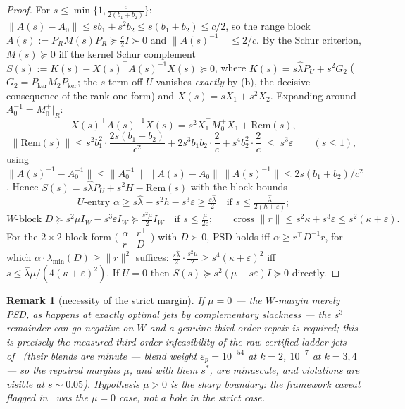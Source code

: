 \documentclass[11pt]{article}
\newtheorem{remark}[theorem]{Remark}
\newcommand{\eps}{\varepsilon}
\newcommand{\lam}{\lambda}
\begin{document}
\begin{proof}
For $s\le\min\{1,\tfrac c{2(b_1+b_2)}\}$:
$\|A(s)-A_0\|\le sb_1+s^2b_2\le s(b_1+b_2)\le c/2$, so the range block
$A(s):=P_RM(s)P_R\succeq\tfrac c2I\succ0$ and $\|A(s)^{-1}\|\le2/c$. By
the Schur criterion, $M(s)\succeq0$ iff the kernel Schur complement
$S(s):=K(s)-X(s)^\top A(s)^{-1}X(s)\succeq0$, where
$K(s)=s\hat\lam P_U+s^2G_2$ ($G_2=P_{\ker}M_2P_{\ker}$; the $s$-term off
$U$ vanishes \emph{exactly} by (b), the decisive consequence of the
rank-one form) and $X(s)=sX_1+s^2X_2$. Expanding around
$A_0^{-1}=M_0^{+}|_R$:
\[
X(s)^\top A(s)^{-1}X(s)=s^2X_1^\top M_0^{+}X_1+\mathrm{Rem}(s),
\]
\[
\|\mathrm{Rem}(s)\|\le s^2b_1^2\cdot\frac{2s(b_1+b_2)}{c^2}
+2s^3b_1b_2\cdot\frac2c+s^4b_2^2\cdot\frac2c\;\le\;s^3\eps\qquad(s\le1),
\]
using $\|A(s)^{-1}-A_0^{-1}\|\le\|A_0^{-1}\|\,\|A(s)-A_0\|\,\|A(s)^{-1}\|
\le2s(b_1+b_2)/c^2$. Hence $S(s)=s\hat\lam P_U+s^2H-\mathrm{Rem}(s)$ with
the block bounds
\[
\text{$U$-entry }\alpha\ge s\hat\lam-s^2h-s^3\eps\ge\tfrac{s\hat\lam}2
\quad\text{if }s\le\tfrac{\hat\lam}{2(h+\eps)};
\]
\[
\text{$W$-block }D\succeq s^2\mu I_W-s^3\eps I_W
\succeq\tfrac{s^2\mu}2I_W\quad\text{if }s\le\tfrac\mu{2\eps};
\qquad
\text{cross }\|r\|\le s^2\kappa+s^3\eps\le s^2(\kappa+\eps).
\]
For the $2\times2$ block form
$\bigl(\begin{smallmatrix}\alpha&r^\top\\ r&D\end{smallmatrix}\bigr)$
with $D\succ0$, PSD holds iff $\alpha\ge r^\top D^{-1}r$, for which
$\alpha\cdot\lambda_{\min}(D)\ge\|r\|^2$ suffices:
$\tfrac{s\hat\lam}2\cdot\tfrac{s^2\mu}2\ge s^4(\kappa+\eps)^2$ iff
$s\le\hat\lam\mu/(4(\kappa+\eps)^2)$. If $U=0$ then
$S(s)\succeq s^2(\mu-s\eps)I\succeq0$ directly.
\end{proof}

\begin{remark}[necessity of the strict margin]\label{rem:mu0}
If $\mu=0$ --- the $W$-margin merely PSD, as happens at \emph{exactly
optimal} jets by complementary slackness --- the $s^3$ remainder can go
negative on $W$ and a genuine third-order repair is required; this is
precisely the measured third-order infeasibility of the raw certified
ladder jets of~\cite{overshoot} (their blends are minute --- blend weight
$\eps_p=10^{-54}$ at $k=2$, $10^{-7}$ at $k=3,4$ --- so the repaired
margins $\mu$, and with them $s^\ast$, are minuscule, and violations are
visible at $s\sim0.05$).
Hypothesis $\mu>0$ is the sharp boundary: the framework caveat flagged
in~\cite{overshoot} was the $\mu=0$ case, not a hole in the strict case.
\end{remark}
\end{document}
